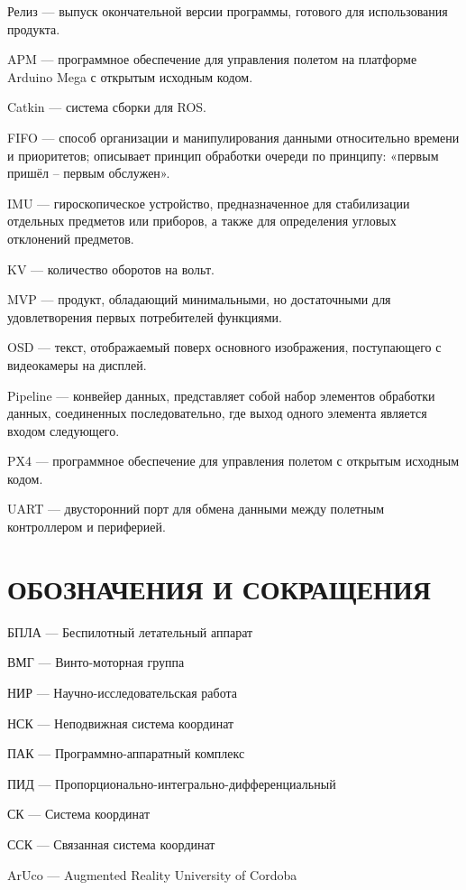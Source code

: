 \documentclass[a4paper,12pt]{article}
\begin{document}
Релиз --- выпуск окончательной версии программы, готового для использования продукта.

APM --- программное обеспечение для управления полетом на платформе Arduino Mega с открытым исходным кодом.

Catkin --- система сборки для ROS.

FIFO --- способ организации и манипулирования данными относительно времени и приоритетов; описывает принцип обработки очереди по принципу: «первым пришёл -- первым обслужен».

IMU --- гироскопическое устройство, предназначенное для стабилизации отдельных предметов или приборов, а также для определения угловых отклонений предметов.

KV --- количество оборотов на вольт.

MVP --- продукт, обладающий минимальными, но достаточными для удовлетворения первых потребителей функциями.

OSD --- текст, отображаемый поверх основного изображения, поступающего с видеокамеры на дисплей.

Pipeline --- конвейер данных, представляет собой набор элементов обработки данных, соединенных последовательно, где выход одного элемента является входом следующего.

PX4 --- программное обеспечение для управления полетом с открытым исходным кодом.

UART --- двусторонний порт для обмена данными между полетным контроллером и периферией.

\pagebreak
\thispagestyle{empty}

\section*{\centering ОБОЗНАЧЕНИЯ И СОКРАЩЕНИЯ}

БПЛА --- Беспилотный летательный аппарат

ВМГ --- Винто-моторная группа

НИР --- Научно-исследовательская работа

НСК --- Неподвижная система координат

ПАК --- Программно-аппаратный комплекс

ПИД --- Пропорционально-интегрально-дифференциальный

СК --- Система координат

ССК --- Связанная система координат

ArUco --- Augmented Reality University of Cordoba
\end{document}
